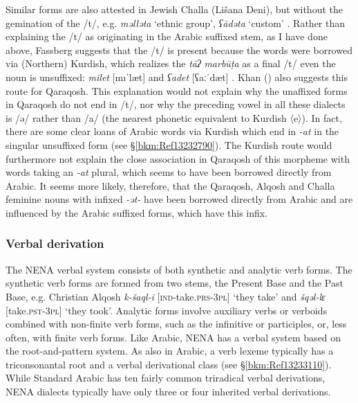 \documentclass[output=paper]{langsci/langscibook}
\begin{document}
Similar forms are also attested in Jewish Challa (Lišana Deni), but without the gemination of the /t/, e.g. \textit{məlləta} ‘ethnic group’, \textit{ʕādəta} ‘custom’ \citep[52]{Fassberg2010}. Rather than explaining the /t/ as originating in the Arabic suffixed stem, as I have done above, Fassberg suggests that the /t/ is present because the words were borrowed via (Northern) Kurdish, which realizes the \textit{tāʔ} \textit{marbūṭa} as a final /t/ even the noun is unsuffixed: \textit{milet} [mıˈlæt] and \textit{ʕadet} [ʕaːˈdæt] \citep[387]{Chyet2003}. Khan (\citeyear[206]{Khan2002}) also suggests this route for Qaraqosh. This explanation would not explain why the unaffixed forms in Qaraqosh do not end in /t/, nor why the preceding vowel in all these dialects is /ə/ rather than /a/ (the nearest phonetic equivalent to Kurdish 〈e〉). In fact, there are some clear loans of Arabic words via Kurdish which end in \textit{{}-at} in the singular unsuffixed form (see §\ref{bkm:Ref13232790}). The Kurdish route would furthermore not explain the close association in Qaraqosh of this morpheme with words taking an \textit{\nobreakdash-at} plural, which seems to have been borrowed directly from Arabic. It seems more likely, therefore, that the Qaraqosh, Alqosh and Challa feminine nouns with infixed \textit{\nobreakdash-ət\nobreakdash-} have been borrowed directly from Arabic and are influenced by the Arabic suffixed forms, which have this infix.

\subsubsection{\label{bkm:Ref13233345}Verbal derivation}

The NENA verbal system consists of both synthetic and analytic verb forms. The synthetic verb forms are formed from two stems, the Present Base and the Past Base, e.g. Christian Alqosh \textit{k\nobreakdash-šaql\nobreakdash-i} [\textsc{ind\nobreakdash-}take.\textsc{prs\nobreakdash-3pl]} ‘they take’ and \textit{šqəl\nobreakdash-lɛ} [take.\textsc{pst\nobreakdash-3pl}] ‘they took’. Analytic forms involve auxiliary verbs or verboids combined with non-finite verb forms, such as the infinitive or participles, or, less often, with finite verb forms. Like Arabic, NENA has a verbal system based on the root-and-pattern system. As also in Arabic, a verb lexeme typically has a triconsonantal root and a verbal derivational class (see §\ref{bkm:Ref13233110}). While Standard Arabic has ten fairly common triradical verbal derivations, NENA dialects typically have only three or four inherited verbal derivations.
\end{document}
